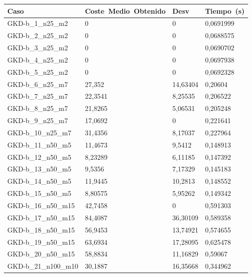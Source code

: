 \pagebreak

\begin{table}[!ht]%
    \centering    
    \begin{adjustbox}{height=12cm}
    \begin{tabular}{|l|l|l|l|}
    \hline
        Caso & Coste~Medio~Obtenido & Desv & Tiempo~(s) \\ \hline
		GKD-b\_1\_n25\_m2    & 0       & 0         & 0,0691999 \\ \hline
		GKD-b\_2\_n25\_m2    & 0       & 0         & 0,0688575 \\ \hline
		GKD-b\_3\_n25\_m2    & 0       & 0         & 0,0690702 \\ \hline
		GKD-b\_4\_n25\_m2    & 0       & 0         & 0,0697938 \\ \hline
		GKD-b\_5\_n25\_m2    & 0       & 0         & 0,0692328 \\ \hline
		GKD-b\_6\_n25\_m7    & 27,352  & 14,63404  & 0,20604   \\ \hline
		GKD-b\_7\_n25\_m7    & 22,3541 & 8,25535   & 0,206522  \\ \hline
		GKD-b\_8\_n25\_m7    & 21,8265 & 5,06531   & 0,205248  \\ \hline
		GKD-b\_9\_n25\_m7    & 17,0692 & 0    & 0,221641  \\ \hline
		GKD-b\_10\_n25\_m7   & 31,4356 & 8,17037   & 0,227964  \\ \hline
		GKD-b\_11\_n50\_m5   & 11,4673 & 9,5412    & 0,148913  \\ \hline
		GKD-b\_12\_n50\_m5   & 8,23289 & 6,11185   & 0,147392  \\ \hline
		GKD-b\_13\_n50\_m5   & 9,5356  & 7,17329   & 0,145183  \\ \hline
		GKD-b\_14\_n50\_m5   & 11,9445 & 10,2813   & 0,148552  \\ \hline
		GKD-b\_15\_n50\_m5   & 8,80575 & 5,95262   & 0,149342  \\ \hline
		GKD-b\_16\_n50\_m15  & 42,7458 & 0     & 0,591303  \\ \hline
		GKD-b\_17\_n50\_m15  & 84,4087 & 36,30109  & 0,589358  \\ \hline
		GKD-b\_18\_n50\_m15  & 56,9453 & 13,74921  & 0,574655  \\ \hline
		GKD-b\_19\_n50\_m15  & 63,6934 & 17,28095  & 0,625478  \\ \hline
		GKD-b\_20\_n50\_m15  & 58,8834 & 11,16829  & 0,59067   \\ \hline
		GKD-b\_21\_n100\_m10 & 30,1887 & 16,35668  & 0,344962  \\ \hline

\end{tabular}
\end{adjustbox}
\end{table}
